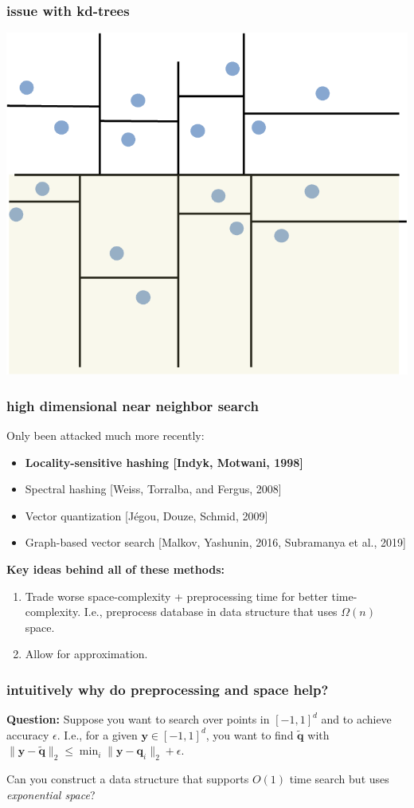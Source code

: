 \documentclass[compress]{beamer}
\newcommand{\bv}[1]{\mathbf{#1}}
\begin{document}
\begin{frame}
	\frametitle{issue with kd-trees}	
	\vspace{1em}

	\centering
	\includegraphics[width=.8\textwidth]{2d-kd-tree.png}	
\end{frame}

\begin{frame}
	\frametitle{high dimensional near neighbor search}	
	Only been attacked much more recently:
	\begin{itemize}
		\item \textbf{\alert{Locality-sensitive hashing [Indyk, Motwani, 1998]}}
		\item Spectral hashing [Weiss, Torralba, and Fergus, 2008]
		\item Vector quantization [J\'{e}gou, Douze, Schmid, 2009]
		\item Graph-based vector search [Malkov, Yashunin, 2016, Subramanya et al., 2019]
	\end{itemize}

\textbf{Key ideas behind all of these methods:} 
\begin{enumerate}
\item Trade worse space-complexity + preprocessing time for better time-complexity. I.e., preprocess database in data structure that uses $\Omega(n)$ space.
\item Allow for approximation.
\end{enumerate}
\end{frame}

\begin{frame}[t]
	\frametitle{intuitively why do preprocessing and space help?}	
	\textbf{Question:} Suppose you want to search over points in $[-1,1]^d$ and to achieve accuracy $\epsilon$. I.e., for a given $\bv{y}\in [-1,1]^d$, you want to find $\tilde{\bv{q}}$ with $\|\bv{y} - \tilde{\bv{q}}\|_2 \leq \min_{i}\|\bv{y} - \bv{q}_i\|_2 + \epsilon$. 
	
	Can you construct a data structure that supports $O(1)$ time search but uses \emph{exponential space}?

\end{frame}
\end{document}
